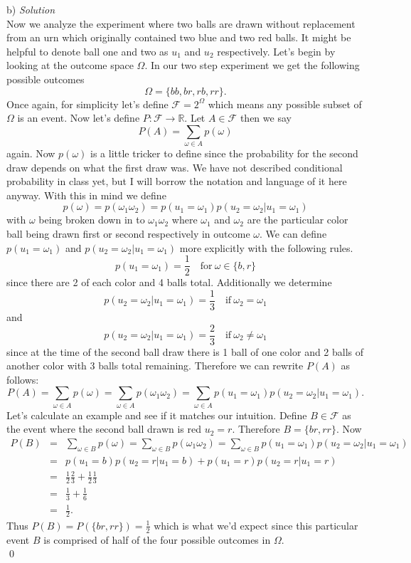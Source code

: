 \documentclass[11pt]{article}
\begin{document}
\noindent
b) \textit{ Solution} \\
Now we analyze the experiment where two balls are drawn without replacement from an urn which originally contained two blue and two red balls.
It might be helpful to denote ball one and two as $u_1$ and $u_2$ respectively.
Let's begin by looking at the outcome space $\Omega$. 
In our two step experiment we get the following possible outcomes 
$$\Omega = \{bb, br, rb, rr\}.$$
Once again, for simplicity let's define $\mathcal{F} = 2^\Omega$ which means any possible subset of $\Omega$ is an event.
Now let's define $P: \mathcal{F} \rightarrow \mathbb{R}$.
Let $A \in \mathcal{F}$ then we say $$P(A) = \sum_{\omega \in A} p(\omega)$$ again.
Now $p(\omega)$ is a little tricker to define since the probability for the second draw depends on what the first draw was. 
We have not described conditional probability in class yet, but I will borrow the notation and language of it here anyway.
With this in mind we define
$$ p(\omega) = p(\omega_1\omega_2)= p(u_1 = \omega_1) p(u_2 = \omega_2 | u_1 = \omega_1)$$ with $\omega$ being broken down in to $\omega_1\omega_2$ where $\omega_1$ and $\omega_2$ are the particular color ball being drawn first or second respectively in outcome $\omega$.
We can define $p(u_1 = \omega_1)$ and $p(u_2 = \omega_2 | u_1 = \omega_1)$ more explicitly with the following rules.
$$
p(u_1 = \omega_1) = \frac{1}{2} \quad \text{for} \: \omega \in \{b, r\}
$$
since there are 2 of each color and 4 balls total.
Additionally we determine
$$p(u_2 = \omega_2 | u_1 = \omega_1) = \frac{1}{3} \quad \text{if} \: \omega_2 = \omega_1$$
and
$$p(u_2 = \omega_2 | u_1 = \omega_1) = \frac{2}{3} \quad \text{if} \: \omega_2 \neq \omega_1$$
since at the time of the second ball draw there is 1 ball of one color and 2 balls of another color with 3 balls total remaining.
Therefore we can rewrite $P(A)$ as follows:
$$P(A) = \sum_{\omega \in A} p(\omega) = \sum_{\omega \in A} p(\omega_1\omega_2)= \sum_{\omega \in A} p(u_1 = \omega_1) p(u_2 = \omega_2 | u_1 = \omega_1).$$
Let's calculate an example and see if it matches our intuition.
Define $B \in \mathcal{F}$ as the event where the second ball drawn is red $u_2 = r$.
Therefore $B = \{br, rr\}$. Now
\begin{eqnarray*}
P(B) &=& \sum_{\omega \in B} p(\omega) = \sum_{\omega \in B} p(\omega_1\omega_2) = \sum_{\omega \in B} p(u_1 = \omega_1) p(u_2 = \omega_2 | u_1 = \omega_1)\\
&=& p(u_1 = b) p(u_2 = r | u_1 = b) + p(u_1 = r) p(u_2 = r | u_1 = r) \\
&=& \frac{1}{2} \frac{2}{3} + \frac{1}{2} \frac{1}{3} \\
&=& \frac{1}{3} + \frac{1}{6} \\
&=& \frac{1}{2}.
\end{eqnarray*}
Thus $P(B) = P(\{br, rr\}) = \frac{1}{2}$ which is what we'd expect since this particular event $B$ is comprised of half of the four possible outcomes in $\Omega$.
\\
\qed
\end{document}
